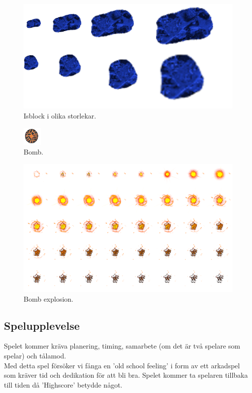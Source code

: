 \documentclass{TDP005mall}
\begin{document}
\begin{figure}[h!]
  \caption{Isblock i olika storlekar.}
    \center
\includegraphics[scale=0.2]{../bilder/originals/Ice_Blocks.png}
\end{figure}

\begin{figure}[h!]
  \caption{Bomb.}
  \center
\includegraphics[scale=1.0]{../bilder/originals/bomb.png}
\end{figure}

\begin{figure}[h!]
\caption{Bomb explosion.}
\includegraphics[scale=0.11]{../bilder/explosions/explosion_4.png}
\end{figure}
\pagebreak  

\subsection{Spelupplevelse}
Spelet kommer kräva planering, timing, samarbete (om det är två spelare som
spelar) och tålamod.\\
Med detta spel försöker vi fånga en 'old school feeling' i form av ett arkadspel
som kräver tid och dedikation för att bli bra. Spelet kommer ta spelaren
tillbaka till tiden då 'Highscore' betydde något.
\end{document}
